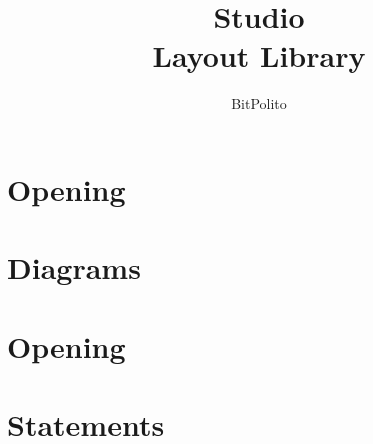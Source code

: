 \documentclass[aspectratio=169]{beamer}
\title{Studio\\Layout Library}
\author{BitPolito}
\institute{Editable slide templates}
\date{}
\newcommand{\studiocataloguename}{}
\begin{document}
\section{Opening}
\gdef\studiocataloguename{\detokenize{cover}}
\gdef\studiocataloguename{\detokenize{contents}}
\gdef\studiocataloguename{\detokenize{section-divider}}
\gdef\studiocataloguename{\detokenize{tabbed-agenda}}
\gdef\studiocataloguename{\detokenize{cover-light}}
\gdef\studiocataloguename{\detokenize{cover-photo}}
\section{Diagrams}
\gdef\studiocataloguename{\detokenize{cover-script-blue}}
\section{Opening}
\gdef\studiocataloguename{\detokenize{cover-dashboard}}
\gdef\studiocataloguename{\detokenize{cover-wide-title}}
\gdef\studiocataloguename{\detokenize{agenda-with-icons}}
\gdef\studiocataloguename{\detokenize{agenda-with-schedule}}
\section{Statements}
\gdef\studiocataloguename{\detokenize{statement-arrow}}
\gdef\studiocataloguename{\detokenize{glow-statement}}
\gdef\studiocataloguename{\detokenize{blue-statement}}
\gdef\studiocataloguename{\detokenize{icon-spotlight-light}}
\gdef\studiocataloguename{\detokenize{icon-spotlight-blue}}
\gdef\studiocataloguename{\detokenize{oversized-word}}
\gdef\studiocataloguename{\detokenize{chat-dialogue}}
\gdef\studiocataloguename{\detokenize{speech-panel}}
\gdef\studiocataloguename{\detokenize{chat-three-messages}}
\gdef\studiocataloguename{\detokenize{oversized-number-light}}
\gdef\studiocataloguename{\detokenize{oversized-number-blue}}
\gdef\studiocataloguename{\detokenize{diagonal-photo-title}}
\gdef\studiocataloguename{\detokenize{title-paragraphs}}
\gdef\studiocataloguename{\detokenize{title-centered-paragraphs}}
\end{document}
